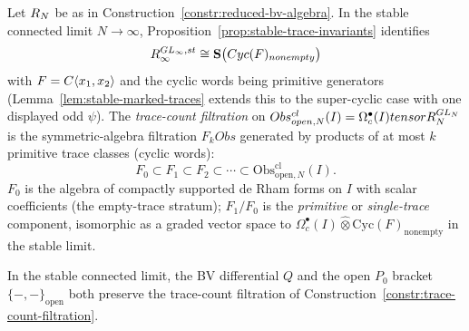\begin{constr}\label{constr:trace-count-filtration}
  Let $R_N$ be as in Construction~\ref{constr:reduced-bv-algebra}.
  In the stable connected limit $N\to\infty$,
  Proposition~\ref{prop:stable-trace-invariants} identifies
  $$R_\infty^{GL_\infty,st}
    \cong\mathbf S\bigl(Cyc(F)_{nonempty}\bigr)$$
  with $F=C\langle x_1,x_2\rangle$ and the cyclic words being primitive
  generators (Lemma~\ref{lem:stable-marked-traces} extends this to the
  super-cyclic case with one displayed odd $\psi$).  The
  \emph{trace-count filtration} on
  $Obs^{cl}_{open,N}(I)
   =\Omega^\bullet_c(I)tensorR_N^{GL_N}$
  is the symmetric-algebra filtration
  $F_kObs$ generated by products of at most $k$ primitive trace classes
  (cyclic words):
  $$F_0\subset F_1\subset F_2\subset\cdots
    \subset\mathrm{Obs}^{\mathrm{cl}}_{\mathrm{open},N}(I).$$
  $F_0$ is the algebra of compactly supported de Rham forms on $I$ with
  scalar coefficients (the empty-trace stratum);
  $F_1\!\big/F_0$ is the \emph{primitive} or \emph{single-trace}
  component, isomorphic as a graded vector space to
  $\Omega^\bullet_c(I)\widehat\otimes\mathrm{Cyc}(F)_{\mathrm{nonempty}}$
  in the stable limit.
\end{constr}

\begin{lem}\label{lem:filtration-preservation}
  In the stable connected limit, the BV differential $Q$ and the open
  $P_0$ bracket $\{-,-\}_{\mathrm{open}}$ both preserve the
  trace-count filtration of
  Construction~\ref{constr:trace-count-filtration}.
\end{lem}

